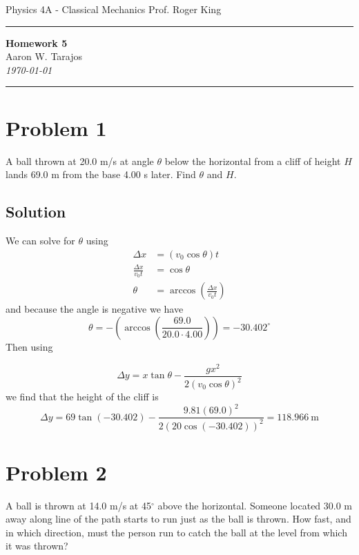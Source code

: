 \documentclass{article}
\begin{document}
\noindent
Physics 4A - Classical Mechanics \hfill Prof. Roger King

\noindent\rule{\textwidth}{0.4pt}

\begin{center}
    \textbf{\LARGE Homework 5} \\
    \vspace{12pt}
    \large Aaron W. Tarajos \\
    \textit{\today}
\end{center}

\noindent\rule{\textwidth}{0.4pt}

\section*{Problem 1}
A ball thrown at 20.0 m/s at angle $\theta$ below the horizontal from a cliff of height $H$ lands 69.0 m from the base 4.00 s later. Find $\theta$ and $H$.

\subsection*{Solution}
We can solve for $\theta$ using
\begin{align*}
	\Delta x &= \left(v_0\cos\theta\right)t \\
	\frac{\Delta x}{v_0 t} &= \cos\theta \\
	\theta &= \arccos\left(\frac{\Delta x}{v_0 t}\right)
\end{align*}
and because the angle is negative we have
\[
	\theta = -\left( \arccos\left(\frac{69.0}{20.0 \cdot 4.00} \right)\right) = \boxed{-30.402^\circ}
\]
Then using

\begin{equation}
	\Delta y = x \tan\theta - \frac{gx^2}{2\left(v_0 \cos\theta\right)^2}
\end{equation}
we find that the height of the cliff is
\[
	\Delta y = 69 \tan\left( -30.402 \right) - \frac{9.81 \left( 69.0 \right)^2 }{2 \left(20 \cos\left( -30.402 \right) \right)^2 } = \boxed{118.966\ \text{m}}
\]

\section*{Problem 2}
A ball is thrown at 14.0 m/s at 45$^\circ$ above the horizontal. Someone located 30.0 m away along line of the path starts to run just as the ball is thrown. How fast, and in which direction, must the person run to catch the ball at the level from which it was thrown?
\end{document}
